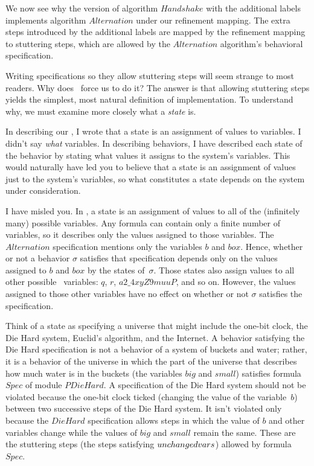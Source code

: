 \documentclass[fleqn,leqno]{article}
\begin{document}
We now see why the version of algorithm $Handshake$ with the
additional labels implements algorithm $Alternation$ under our
refinement mapping.  The extra steps introduced by the additional
labels are mapped by the refinement mapping to stuttering steps, which
are allowed by the $Alternation$ algorithm's behavioral specification.

\bigskip

Writing specifications so they allow stuttering steps will seem
strange to most readers.  Why does \tlaplus\ force us to do it?  The
answer is that allowing stuttering steps yields the simplest, most
natural definition of implementation.  To understand why, we must
examine more closely what a \emph{state} is.

In describing our 
  ,
I wrote that a state is an assignment of values to variables.  I
didn't say \emph{what} variables.  In describing behaviors, I have
described each state of the behavior by stating what values it assigns
to the system's variables.  This would naturally have led you to
believe that a state is an assignment of values just to the system's
variables, so what constitutes a state depends on the system under
consideration.  

I have misled you.  In \tlaplus, 
a state is an assignment of values to
all of the (infinitely many) possible variables.  Any formula can
contain only a finite number of variables, so it describes only the
values assigned to those variables.  The $Alternation$ specification
mentions only the variables $b$ and $box$.  Hence, whether or
not a behavior $\sigma$ satisfies that specification depends only on
the values assigned to $b$ and $box$ by the states of~$\sigma$.
Those states also assign values to all other possible \tlaplus\
variables: $q$, $r$, $a2\_4xyZ9muuP$, and so on.%
However, the values assigned to those other variables have no effect
on whether or not $\sigma$ satisfies the specification.

Think of a state as specifying a universe that might include the
one-bit clock, the Die Hard system, Euclid's algorithm, and the
Internet.  A behavior satisfying the Die Hard specification is not a
behavior of a system of buckets and water; rather, it is a behavior of
the universe in which the part of the universe that describes how much
water is in the buckets (the variables $big$ and $small$) satisfies
formula $Spec$ of module $PDieHard$.  A specification of the Die Hard
system should not be violated because the one-bit clock ticked
(changing the value of the variable~$b$) between two successive steps
of the Die Hard system.  It isn't violated only because the $DieHard$
specification allows steps in which the value of $b$ and other
variables change while the values of $big$ and $small$ remain the
same.  These are the stuttering steps (the steps satisfying
$\UNCHANGED vars$) allowed by formula $Spec$.
\end{document}
